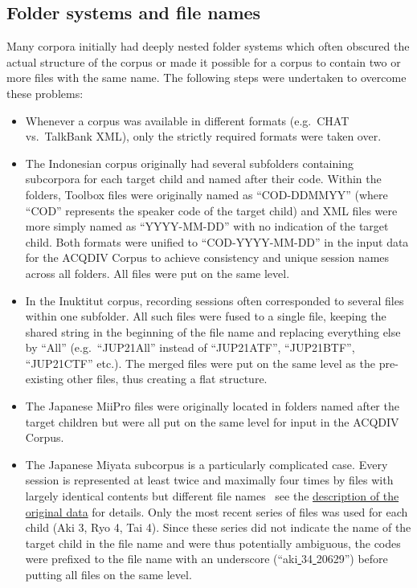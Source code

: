 \documentclass[a4paper, 11pt]{book}
\newcommand{\und}{\underline{{ }}\hspace{0.2mm}}	%
\begin{document}
\subsection{Folder systems and file names}

Many corpora initially had deeply nested folder systems which often obscured the actual structure of the corpus or made it possible for a corpus to contain two or more files with the same name. The following steps were undertaken to overcome these problems:

\begin{itemize}
	\item Whenever a corpus was available in different formats (e.g.\ CHAT vs.\ TalkBank XML), only the strictly required formats were taken over. 
	\item The Indonesian corpus originally had several subfolders containing subcorpora for each target child and named after their code. Within the folders, Toolbox files were originally named as “COD-DDMMYY” (where “COD” represents the speaker code of the target child) and XML files were more simply named as “YYYY-MM-DD” with no indication of the target child. Both formats were unified to “COD-YYYY-MM-DD” in the input data for the ACQDIV Corpus to achieve consistency and unique session names across all folders. All files were put on the same level. 
	\item In the Inuktitut corpus, recording sessions often corresponded to several files within one subfolder. All such files were fused to a single file, keeping the shared string in the beginning of the file name and replacing everything else by “All” (e.g.\ “JUP21All” instead of “JUP21ATF”, “JUP21BTF”, “JUP21CTF” etc.). The merged files were put on the same level as the pre-existing other files, thus creating a flat structure. 
	\item The Japanese MiiPro files were originally located in folders named after the target children but were all put on the same level for input in the ACQDIV Corpus. 
	\item The Japanese Miyata subcorpus is a particularly complicated case. Every session is represented at least twice and maximally four times by files with largely identical contents but different file names \textendash\ see the \hyperref[subsec:Miyata file system and formats]{description of the original data} for details. Only the most recent series of files was used for each child (Aki 3, Ryo 4, Tai 4). Since these series did not indicate the name of the target child in the file name and were thus potentially ambiguous, the codes were prefixed to the file name with an underscore (“aki\und 34\und 20629”) before putting all files on the same level. 

\end{itemize}
\end{document}
